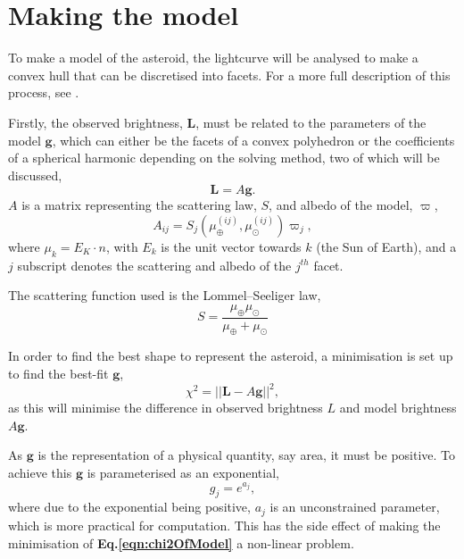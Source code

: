 \documentclass[10pt,twocolumn]{revtex4}    %
\newcommand*{\astrosun}{{\odot}}
\newcommand*{\earth}{{\oplus}}
\newcommand{\refeq}[1]{\textbf{Eq.#1}}
\begin{document}
\section{Making the model}
 
To make a model of the asteroid, the lightcurve will be analysed to make a convex hull that can be discretised into facets. For a more full description of this process, see \cite{ModelMaking}.

Firstly, the observed brightness, $\textbf{L}$, must be related to the parameters of the model $\textbf{g}$, which can either be the facets of a convex polyhedron or the coefficients of a spherical harmonic depending on the solving method, two of which will be discussed,
\begin{equation}\label{eqn:Landg}
    \textbf{L} = A\textbf{g}.
\end{equation}
$A$ is a matrix representing the scattering law, $S$, and albedo of the model, $\varpi$,
\begin{equation}\label{eqn:matrixA}
    A_{ij} = S_j(\mu^{(ij)}_\earth,\mu^{(ij)}_\astrosun) \varpi_j,
\end{equation}
where $\mu_k = E_K \cdot n$, with $E_k$ is the unit vector towards $k$ (the Sun of Earth), and a $j$ subscript denotes the scattering and albedo of the $j^{th}$ facet. 

The scattering function used is the  Lommel–Seeliger law,
\begin{equation}
    S = \frac{\mu_\earth \mu_\astrosun}{\mu_\earth + \mu_\astrosun}
\end{equation}

In order to find the best shape to represent the asteroid, a minimisation is set up to find the best-fit $\textbf{g}$,
\begin{equation}\label{eqn:chi2OfModel}
    \chi^2 = ||\textbf{L} - A\textbf{g}||^2,
\end{equation}
as this will minimise the difference in observed brightness $L$ and model brightness $A\textbf{g}$.

As $\textbf{g}$ is the representation of a physical quantity, say area, it must be positive. To achieve this $\textbf{g}$ is parameterised as an exponential,
\begin{equation}
    \label{eqn:parametariseg}
    g_j = e^{a_j},
\end{equation}where due to the exponential being positive, $a_j$ is an unconstrained parameter, which is more practical for computation. This has the side effect of making the minimisation of \refeq{\ref{eqn:chi2OfModel}} a non-linear problem.
\end{document}
